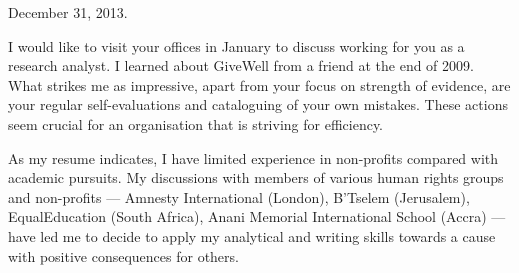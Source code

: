 \documentclass{letter}
\begin{document}
\begin{letter}{}


\signature{\mbox{ }\\[-1.5 cm]Sasha Rubin\\\texttt{sasha.rubin@gmail.com}\ \texttt{forsyte.at/people/rubin/}}


\hfill December 31, 2013.

I would like to visit your offices in January to discuss working for you as a research analyst. 
I learned about GiveWell from a friend at the end of 2009. What strikes me as impressive, apart from your focus on strength of evidence, are your regular self-evaluations and cataloguing of your own mistakes. These actions seem crucial for an organisation that is striving for  efficiency. 

As my resume indicates, I have limited experience in non-profits compared with academic pursuits. My discussions with members of various human rights groups and non-profits --- Amnesty International (London), B'Tselem (Jerusalem),  EqualEducation (South Africa), Anani Memorial International School (Accra) --- have led me to decide to apply my analytical and writing skills towards a cause with positive consequences for others.

%


\end{letter}
\end{document}
